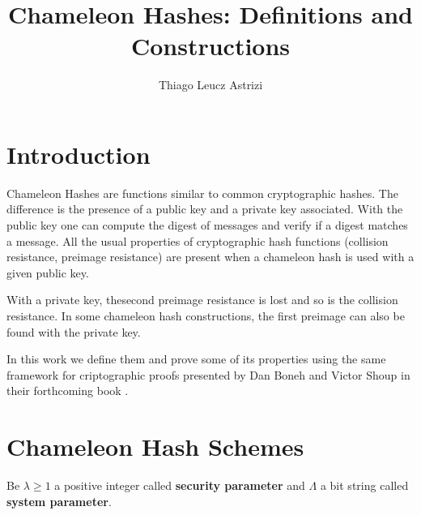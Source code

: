 \documentclass[a4paper]{article}
\title{Chameleon Hashes: Definitions and Constructions}
\author{Thiago Leucz Astrizi}
\begin{document}
    
    \maketitle
    
    \section{Introduction}
    
    Chameleon Hashes are functions similar to common cryptographic hashes.
    The difference is the presence of a public key and a private key
    associated. With the public key one can compute the digest of
    messages and verify if a digest matches a message. All the usual
    properties of cryptographic hash functions (collision resistance,
    preimage resistance) are present when a chameleon hash is used
    with a given public key.
    
    With a private key, thesecond preimage resistance is lost and so
    is the collision resistance. In some chameleon hash constructions,
    the first preimage can also be found with the private key.
    
    In this work we define them and prove some of its properties
    using the same framework for criptographic proofs presented by
    Dan Boneh and  Victor Shoup in their forthcoming book \cite{livro}.
    
    \section{Chameleon Hash Schemes}
    
    Be $\lambda \geq 1$ a positive integer called 
    \textbf{security parameter} and
    $\Lambda$ a bit string called \textbf{system parameter}. 
    
\end{document}
